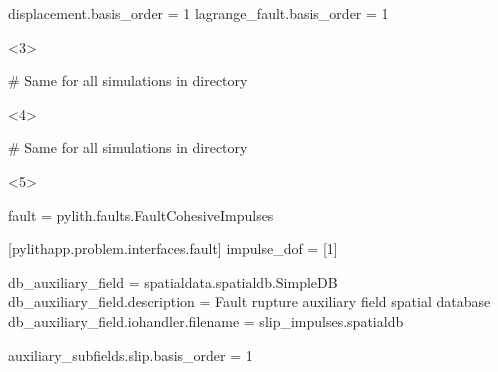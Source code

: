 \documentclass{beamer}
\begin{document}
\begin{frame}[t,fragile]
\begin{minipage}[t]{0.60\textwidth}
\begin{onlyenv}
\begin{cfgcode}
        displacement.basis_order = 1
        lagrange_fault.basis_order = 1
      \end{cfgcode}
    \end{onlyenv}
    \begin{onlyenv}<3>
      \begin{cfgcode}
        # Same for all simulations in directory
      \end{cfgcode}
    \end{onlyenv}
    \begin{onlyenv}<4>
      \begin{cfgcode}
        # Same for all simulations in directory
      \end{cfgcode}
    \end{onlyenv}
    \begin{onlyenv}<5>
      \begin{cfgcode}
        fault = pylith.faults.FaultCohesiveImpulses

        [pylithapp.problem.interfaces.fault]
        impulse_dof = [1]

        db_auxiliary_field = spatialdata.spatialdb.SimpleDB
        db_auxiliary_field.description = Fault rupture auxiliary field spatial database
        db_auxiliary_field.iohandler.filename = slip_impulses.spatialdb

        auxiliary_subfields.slip.basis_order = 1
      \end{cfgcode}
    \end{onlyenv}
  \end{minipage}

  
\end{frame}
\end{document}
